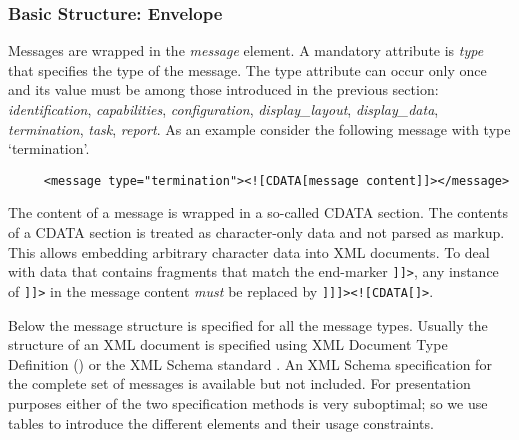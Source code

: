 \documentclass{article}
\begin{document}
   \subsubsection{Basic Structure: Envelope} \label{ss:structure}

    \noindent Messages are wrapped in the \textit{message} element. A mandatory
    attribute is \textit{type} that specifies the type of the message. The type
    attribute can occur only once and its value must be among those introduced
    in the previous section: \textit{identification}, \textit{capabilities},
    \textit{configuration}, \textit{display\_layout}, \textit{display\_data},
    \textit{termination}, \textit{task},
    \textit{report}. As an example consider the following message with type
    `termination'.
 
    \begin{verbatim}
     <message type="termination"><![CDATA[message content]]></message>\end{verbatim}

    \noindent The content of a message is wrapped in a so-called CDATA section. The
    contents of a CDATA section is treated as character-only data and not
    parsed as markup. This allows embedding arbitrary character data into XML
    documents. To deal with data that contains fragments that match the
    end-marker \verb']]>', any instance of \verb']]>' in the message content
    \textit{must} be replaced by \verb']]]><![CDATA[]>'.
    
    \noindent Below the message structure is specified for all the message
    types. Usually the structure of an XML document is specified using XML
    Document Type Definition (\cite{Sperberg-McQueen:06:EML}) or the XML Schema
    standard \cite{Malhotra:06:XSP}. An XML Schema specification for the
    complete set of messages is available but not included. For presentation
    purposes either of the two specification methods is very suboptimal; so we
    use tables to introduce the different elements and their usage constraints.


   
\end{document}

